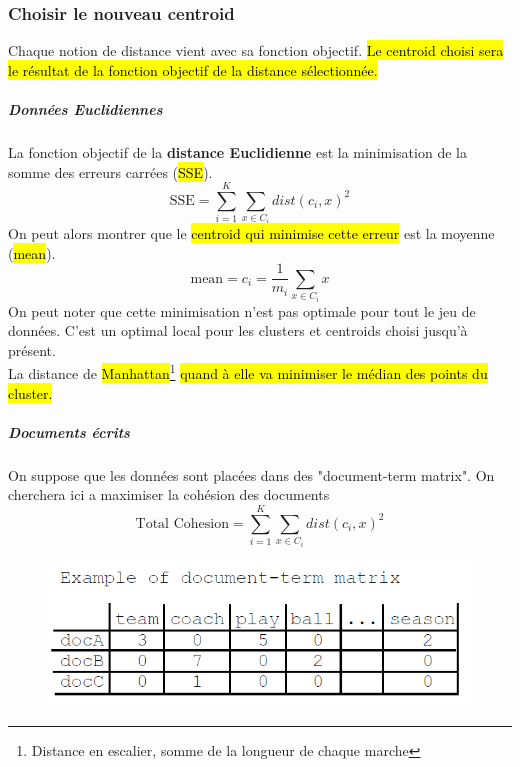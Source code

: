 \documentclass[letterpaper, 12pt]{article}
\newcommand{\alinea}{
\hspace*{0.5cm}}
\begin{document}
			\subsubsection{Choisir le nouveau centroid}
				\alinea Chaque notion de distance vient avec sa fonction
					objectif. \hl{Le centroid choisi sera le résultat de la
					fonction objectif de la distance sélectionnée.}
				\subparagraph{Données Euclidiennes} La fonction objectif
					de la \textbf{distance Euclidienne} est la minimisation
					de la somme des erreurs carrées (\hl{SSE}).
					$$ \text{SSE} = 
						\sum_{i=1}^{K}\sum_{x\in C_i} dist(c_i, x)^2 $$
					On peut alors montrer que le \hl{centroid qui minimise 
					cette erreur} est la moyenne (\hl{mean}).
					$$ \text{mean} = c_i = \frac{1}{m_i}\sum_{x\in C_i} x $$
					On peut noter que cette minimisation n'est pas optimale
					pour tout le jeu de données. C'est un optimal local
					pour les clusters et centroids choisi jusqu'à présent.\\
					La distance de \hl{Manhattan}\footnote{Distance en
					escalier, somme de la longueur de chaque marche} 
					\hl{quand à elle va minimiser le médian des points du
					cluster.}
				\subparagraph{Documents écrits} On suppose que les données
					sont placées dans des "document-term matrix". 
					On cherchera ici a maximiser la cohésion des
					documents
					$$ \text{Total Cohesion} = 
						\sum_{i=1}^{K}\sum_{x\in C_i} dist(c_i, x)^2 $$
					\begin{figure}[H]
						\centering
						\includegraphics[scale=0.5]{Images/document.png}
						\caption{}
						\label{fig:document-term}
					\end{figure}\noindent
\end{document}
